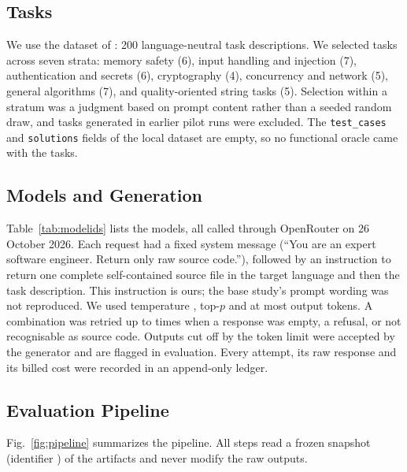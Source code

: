 \documentclass[conference]{IEEEtran}
\begin{document}
\subsection{Tasks}
We use the dataset of \cite{kharma2026}: 200 language-neutral task
descriptions. We selected \nTasks{} tasks across seven strata: memory safety
(6), input handling and injection (7), authentication and secrets (6),
cryptography (4), concurrency and network (5), general algorithms (7), and
quality-oriented string tasks (5). Selection within a stratum was a judgment
based on prompt content rather than a seeded random draw, and tasks generated
in earlier pilot runs were excluded. The \texttt{test\_cases} and
\texttt{solutions} fields of the local dataset are empty, so no functional
oracle came with the tasks.

\subsection{Models and Generation}
Table~\ref{tab:modelids} lists the models, all called through OpenRouter on
26 October 2026. Each request had a fixed system message (``You are an expert
software engineer. Return only raw source code.''), followed by an instruction
to return one complete self-contained source file in the target language and
then the task description. This instruction is ours; the base study's prompt
wording was not reproduced. We used temperature \temperature{}, top-$p$
\topP{} and at most \maxTokens{} output tokens. A combination was retried up to
\maxAttempts{} times when a response was empty, a refusal, or not
recognisable as source code. Outputs cut off by the token limit were accepted by
the generator and are flagged in evaluation. Every attempt, its raw response
and its billed cost were recorded in an append-only ledger.

\begin{table}[t]
\caption{Models (OpenRouter identifiers)}
\label{tab:modelids}
\centering\footnotesize

\end{table}

\subsection{Evaluation Pipeline}
Fig.~\ref{fig:pipeline} summarizes the pipeline. All steps read a frozen
snapshot (identifier \texttt{\snapshotId}) of the \nArtifacts{} artifacts and
never modify the raw outputs.
\end{document}
